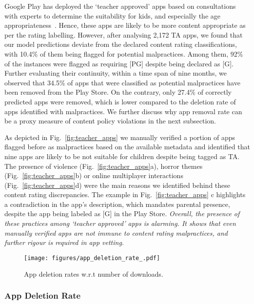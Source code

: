 Google Play has deployed the `teacher approved' apps based on consultations with experts to determine the suitability for kids, and especially the age appropriateness~\cite{teacherAApps}. Hence, these apps are likely to be more content appropriate as per the rating labelling. However, after analysing 2,172 TA apps, we found that our model predictions deviate from the declared content rating classifications, with 10.4\% of them being flagged for potential malpractices. Among them, 92\% of the instances were flagged as requiring [PG] despite being declared as [G]. Further evaluating their continuity, within a time span of nine months, we observed that 34.5\% of apps that were classified as potential malpractices have been removed from the Play Store. On the contrary, only 27.4\% of correctly predicted apps were removed, which is lower compared to the deletion rate of apps identified with malpractices.
We further discuss why app removal rate can be a proxy measure of content policy violations in the next subsection. 


As depicted in Fig.~\ref{fig:teacher_apps} we manually verified a portion of apps flagged before as malpractices based on the available metadata and identified that nine apps are likely to be not suitable for children despite being tagged as TA. 
The presence of violence (Fig.~\ref{fig:teacher_apps}a), horror themes (Fig.~\ref{fig:teacher_apps}b) or online multiplayer interactions (Fig.~\ref{fig:teacher_apps}d) were the main reasons we identified behind these content rating discrepancies. 
The example in Fig.~\ref{fig:teacher_apps} c highlights a contradiction in the app's description, which mandates parental presence, despite the app being labeled as [G] in the Play Store.
\textit{Overall, the presence of these practices among `teacher approved' apps is alarming. It shows that even manually verified apps are not immune to content rating malpractices, and further rigour is required in app vetting.}


\begin{figure}[ht]    
    \centering
    \texttt{[image: figures/app\_deletion\_rate\_.pdf]}
    \caption{App deletion rates w.r.t number of downloads.}
    \label{fig:app_deletion}
\end{figure}


\subsubsection{App Deletion Rate}

